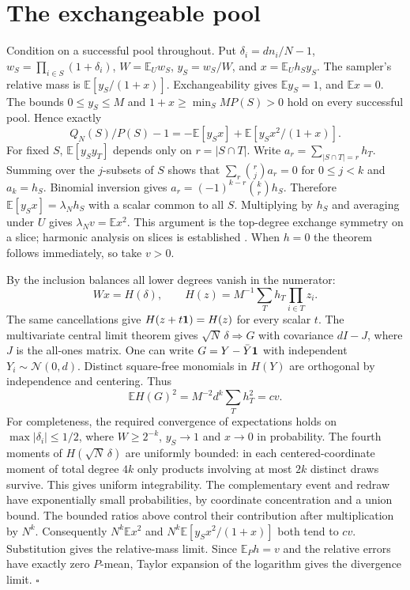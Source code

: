 \documentclass[11pt]{article}
\newcommand{\EE}{\mathbb E}\newcommand{\Var}{\operatorname{Var}}
\begin{document}
\section{The exchangeable pool}
Condition on a successful pool throughout. Put $\delta_i=dn_i/N-1$, $w_S=\prod_{i\in S}(1+\delta_i)$, $W=\EE_U w_S$, $y_S=w_S/W$, and $x=\EE_U h_S y_S$. The sampler's relative mass is $\EE[y_S/(1+x)]$. Exchangeability gives $\EE y_S=1$, and $\EE x=0$. The bounds $0\le y_S\le M$ and $1+x\ge \min_S MP(S)>0$ hold on every successful pool. Hence exactly
\[
 Q_N(S)/P(S)-1=-\EE[y_S x]+\EE[y_S x^2/(1+x)].
\]
For fixed $S$, $\EE[y_S y_T]$ depends only on $r=|S\cap T|$. Write $a_r=\sum_{|S\cap T|=r}h_T$. Summing over the $j$-subsets of $S$ shows that $\sum_r\binom rj a_r=0$ for $0\le j<k$ and $a_k=h_S$. Binomial inversion gives $a_r=(-1)^{k-r}\binom kr h_S$. Therefore $\EE[y_Sx]=\lambda_N h_S$ with a scalar common to all $S$. Multiplying by $h_S$ and averaging under $U$ gives $\lambda_N v=\EE x^2$. This argument is the top-degree exchange symmetry on a slice; harmonic analysis on slices is established \cite{filmus}. When $h=0$ the theorem follows immediately, so take $v>0$.

By the inclusion balances all lower degrees vanish in the numerator:
\[
  Wx=H(\delta),\qquad H(z)=M^{-1}\sum_T h_T\prod_{i\in T}z_i.
\]
The same cancellations give $H(z+t{\bf1})=H(z)$ for every scalar $t$. The multivariate central limit theorem gives $\sqrt N\,\delta\Rightarrow G$ with covariance $dI-J$, where $J$ is the all-ones matrix. One can write $G=Y-\bar Y{\bf1}$ with independent $Y_i\sim\mathcal N(0,d)$. Distinct square-free monomials in $H(Y)$ are orthogonal by independence and centering. Thus
\[
 \EE H(G)^2=M^{-2}d^k\sum_T h_T^2=cv.
\]
For completeness, the required convergence of expectations holds on $\max|\delta_i|\le1/2$, where $W\ge2^{-k}$, $y_S\to1$ and $x\to0$ in probability. The fourth moments of $H(\sqrt N\,\delta)$ are uniformly bounded: in each centered-coordinate moment of total degree $4k$ only products involving at most $2k$ distinct draws survive. This gives uniform integrability. The complementary event and redraw have exponentially small probabilities, by coordinate concentration and a union bound. The bounded ratios above control their contribution after multiplication by $N^k$. Consequently $N^k\EE x^2$ and $N^k\EE[y_Sx^2/(1+x)]$ both tend to $cv$. Substitution gives the relative-mass limit. Since $\EE_P h=v$ and the relative errors have exactly zero $P$-mean, Taylor expansion of the logarithm gives the divergence limit. \hfill$\square$
\end{document}
